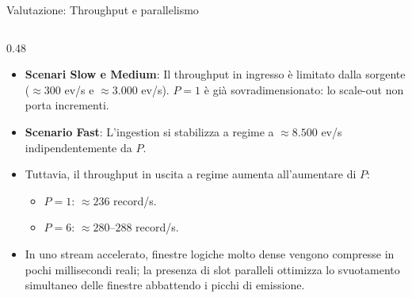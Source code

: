 \documentclass[10pt, aspectratio=169]{beamer}
\begin{document}
\begin{frame}{Valutazione: Throughput e parallelismo}
\begin{columns}[c]
        \begin{column}{0.48\textwidth}
            \begin{itemize}
                \footnotesize
                \item \textbf{Scenari Slow e Medium}: Il throughput in ingresso è limitato dalla sorgente ($\approx 300$ ev/s e $\approx 3.000$ ev/s). $P=1$ è già sovradimensionato: lo scale-out non porta incrementi.
                \item \textbf{Scenario Fast}: L'ingestion si stabilizza a regime a $\approx 8.500$ ev/s indipendentemente da $P$.
                \item Tuttavia, il throughput in uscita a regime aumenta all'aumentare di $P$:
                \begin{itemize}
                    \scriptsize
                    \item $P=1$: $\approx 236$ record/s.
                    \item $P=6$: $\approx 280\text{--}288$ record/s.
                \end{itemize}
                \item In uno stream accelerato, finestre logiche molto dense vengono compresse in pochi millisecondi reali; la presenza di slot paralleli ottimizza lo svuotamento simultaneo delle finestre abbattendo i picchi di emissione.
            \end{itemize}
        \end{column}
    \end{columns}
\end{frame}
\end{document}
